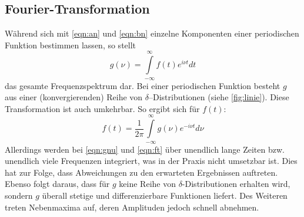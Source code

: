 \subsection{Fourier-Transformation}
Während sich mit \eqref{eqn:an} und \eqref{eqn:bn} einzelne Komponenten einer periodischen Funktion bestimmen lassen,
so stellt
\begin{equation}
  g(\nu)=\int\limits_{-\infty}^\infty f(t)e^{i\nu t}dt \label{eqn:gnu}
\end{equation}
das gesamte Frequenzspektrum dar.
Bei einer periodischen Funktion besteht $g$ aus einer (konvergierenden) Reihe von $\delta$--Distributionen (siehe \ref{fig:linie}).
Diese Transformation ist auch umkehrbar. So ergibt sich für $f(t)$:
\begin{equation}
  f(t)=\frac{1}{2\pi}\int\limits_{-\infty}^\infty g(\nu)e^{-i\nu t}d\nu \label{eqn:ft}
\end{equation}
Allerdings werden bei \eqref{eqn:gnu} und \eqref{eqn:ft} über unendlich lange Zeiten bzw.
 unendlich viele Frequenzen integriert,
was in der Praxis nicht umsetzbar ist.
Dies hat zur Folge, dass Abweichungen zu den erwarteten Ergebnissen auftreten.
Ebenso folgt daraus, dass für $g$ keine Reihe von $\delta$-Distributionen erhalten wird,
sondern $g$ überall stetige und differenzierbare
Funktionen liefert. Des Weiteren treten Nebenmaxima auf, deren Amplituden jedoch schnell abnehmen.
